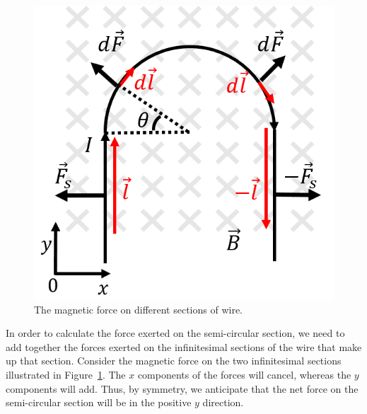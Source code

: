 \begin{framed}
\begin{framed}
\begin{figure}[!htbp]
\centering
\includegraphics[width=0.4\linewidth]{files/semicircle_sol-3a4aea39b14c75d335f7088ec6b14073.png}
\caption[]{The magnetic force on different sections of wire.}
\label{fig:magneticforce:semicircle_sol}
\end{figure}

In order to calculate the force exerted on the semi-circular section, we need to add together the forces exerted on the infinitesimal sections of the wire that make up that section. Consider the magnetic force on the two infinitesimal sections illustrated in Figure~\ref{fig:magneticforce:semicircle_sol}. The $x$ components of the forces will cancel, whereas the $y$ components will add. Thus, by symmetry, we anticipate that the net force on the semi-circular section will be in the positive $y$ direction.


\end{framed}
\end{framed}
